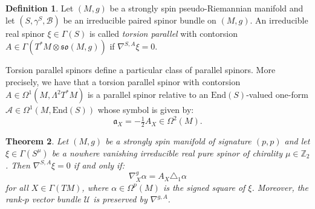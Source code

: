 \documentclass[10pt,reqno]{amsart}
\newtheorem{theorem}{Theorem}[section]
\theoremstyle{definition}
\newtheorem{definition}[theorem]{Definition}
\theoremstyle{remark}
\newcommand{\Z}{\mathbb{Z}}
\newcommand{\End}{\mathrm{End}}
\begin{document}
\begin{definition}
    Let $(M,g)$ be a strongly spin pseudo-Riemannian manifold and let $(S,\gamma^S,\mathscr{B})$ be an irreducible paired spinor bundle on $(M,g)$. An irreducible real spinor $\xi\in\Gamma(S)$ is called \emph{torsion parallel} with contorsion $A\in\Gamma(T^*M\otimes\mathfrak{so}(M,g))$ if $\nabla^{S,A}\xi=0$.
\end{definition}

Torsion parallel spinors define a particular class of parallel spinors. More precisely, we have that a torsion parallel spinor with contorsion $A\in\Omega^1(M,\Lambda^2T^*M)$ is a parallel spinor relative to an $\End(S)$-valued one-form $\mathcal{A}\in\Omega^1(M,\End(S))$ whose symbol is given by: $$\mathfrak{a}_X=-\tfrac{1}{2}A_X\in\Omega^2(M).$$

\begin{theorem}\label{thm:torsion_parallel}
    Let $(M,g)$ be a strongly spin manifold of signature $(p,p)$ and let $\xi\in\Gamma(S^\mu)$ be a nowhere vanishing irreducible real pure spinor of chirality $\mu\in\Z_2$. Then $\nabla^{S,A}\xi=0$ if and only if: $$\nabla^g_X\alpha=A_X\triangle_1\alpha$$ for all $X\in\Gamma(TM)$, where $\alpha\in\Omega^p(M)$ is the signed square of $\xi$. Moreover, the rank-$p$ vector bundle $\mathcal{U}$ is preserved by $\nabla^{g,A}$.
\end{theorem}
\end{document}
